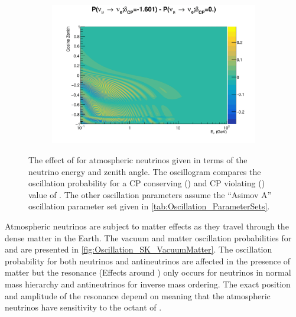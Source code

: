 \begin{figure}[h]
  \begin{subfigure}[t]{\textwidth}
    \includegraphics[width=\textwidth, trim={0mm 0mm 0mm 0mm}, clip,page=1]{Figures/Oscillation/AtmDCPSens.pdf}
  \end{subfigure}
  \caption{The effect of \dcp for atmospheric neutrinos given in terms of the neutrino energy and zenith angle. The oscillogram compares the  oscillation probability for a CP conserving () and CP violating () value of \dcp. The other oscillation parameters assume the ``Asimov A'' oscillation parameter set given in \autoref{tab:Oscillation_ParameterSets}.}
  \label{fig:Oscillation_SK_DCPSensitivity}
\end{figure}

Atmospheric neutrinos are subject to matter effects as they travel through the dense matter in the Earth. The vacuum and matter oscillation probabilities for  and  are presented in \autoref{fig:Oscillation_SK_VacuumMatter}. The oscillation probability for both neutrinos and antineutrinos are affected in the presence of matter but the resonance (Effects around ) only occurs for neutrinos in normal mass hierarchy and antineutrinos for inverse mass ordering. The exact position and amplitude of the resonance depend on \sinsqatm meaning that the atmospheric neutrinos have sensitivity to the octant of . 

